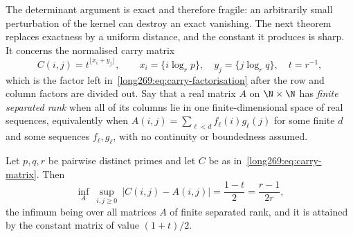 \documentclass[11pt]{article}
\begin{document}
The determinant argument is exact and therefore fragile: an arbitrarily small
perturbation of the kernel can destroy an exact vanishing.  The next theorem
replaces exactness by a uniform distance, and the constant it produces is
sharp.  It concerns the normalised carry matrix
\begin{equation}\label{long269:eq:carry-matrix}
 C(i,j)=t^{\lfloor x_i+y_j\rfloor},
 \qquad
 x_i=\{i\log_r p\},\quad y_j=\{j\log_r q\},\quad t=r^{-1},
\end{equation}
which is the factor left in~\eqref{long269:eq:carry-factorisation} after the row and
column factors are divided out.  Say that a real matrix $A$ on $\N\times\N$ has
\emph{finite separated rank} when all of its columns lie in one
finite-dimensional space of real sequences, equivalently when
$A(i,j)=\sum_{\ell<d}f_\ell(i)g_\ell(j)$ for some finite $d$ and some
sequences $f_\ell,g_\ell$, with no continuity or boundedness assumed.

\begin{theorem}\label{long269:res:uniform-rank}
Let $p,q,r$ be pairwise distinct primes and let $C$ be as
in~\eqref{long269:eq:carry-matrix}.  Then
\[
 \inf_{A}\ \sup_{i,j\ge0}\ |C(i,j)-A(i,j)|=\frac{1-t}{2}=\frac{r-1}{2r},
\]
the infimum being over all matrices $A$ of finite separated rank, and it is
attained by the constant matrix of value $(1+t)/2$.
\end{theorem}
\end{document}
